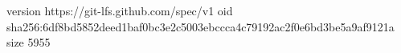 version https://git-lfs.github.com/spec/v1
oid sha256:6df8bd5852deed1baf0bc3e2c5003ebccca4c79192ac2f0e6bd3be5a9af9121a
size 5955

